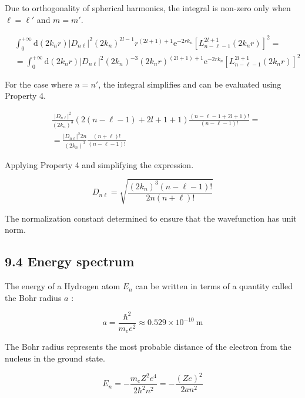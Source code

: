 \documentclass[10pt]{article}
\begin{document}
Due to orthogonality of spherical harmonics, the integral is non-zero only when $\ell=\ell'$ and $m=m'$.

\begin{align*}
& \int_{0}^{+\infty} \mathrm{d}\left(2 k_{n} r\right)\left|D_{n \ell}\right|^{2}\left(2 k_{n}\right)^{2 l-1} r^{(2 l+1)+1} \mathrm{e}^{-2 r k_{n}}\left[L_{n-\ell-1}^{2 l+1}\left(2 k_{n} r\right)\right]^{2}= \\
& =\int_{0}^{+\infty} \mathrm{d}\left(2 k_{n} r\right)\left|D_{n \ell}\right|^{2}\left(2 k_{n}\right)^{-3}\left(2 k_{n} r\right)^{(2 l+1)+1} \mathrm{e}^{-2 r k_{n}}\left[L_{n-\ell-1}^{2 l+1}\left(2 k_{n} r\right)\right]^{2} \tag{9.82}
\end{align*}

For the case where $n=n'$, the integral simplifies and can be evaluated using Property 4.

\begin{align*}
& \frac{\left|D_{n \ell}\right|^{2}}{\left(2 k_{n}\right)^{3}}(2(n-\ell-1)+2 l+1+1) \frac{(n-\ell-1+2 l+1)!}{(n-\ell-1)!}=  \tag{9.83}\\
& =\frac{\left|D_{n \ell}\right|^{2} 2 n}{\left(2 k_{n}\right)^{3}} \frac{(n+\ell)!}{(n-\ell-1)!}
\end{align*}

Applying Property 4 and simplifying the expression.

\begin{equation*}
D_{n \ell}=\sqrt{\frac{\left(2 k_{n}\right)^{3}(n-\ell-1)!}{2 n(n+\ell)!}} \tag{9.84}
\end{equation*}

The normalization constant determined to ensure that the wavefunction has unit norm.

\subsection*{9.4 Energy spectrum}
The energy of a Hydrogen atom $E_{n}$ can be written in terms of a quantity called the Bohr radius $a$ :

\begin{equation*}
a=\frac{\hbar^{2}}{m_{e} e^{2}} \approx 0.529 \times 10^{-10} \mathrm{~m} \tag{9.85}
\end{equation*}

The Bohr radius represents the most probable distance of the electron from the nucleus in the ground state.

\begin{equation*}
E_{n}=-\frac{m_{e} Z^{2} e^{4}}{2 \hbar^{2} n^{2}}=-\frac{(Z e)^{2}}{2 a n^{2}} \tag{9.86}
\end{equation*}
\end{document}
